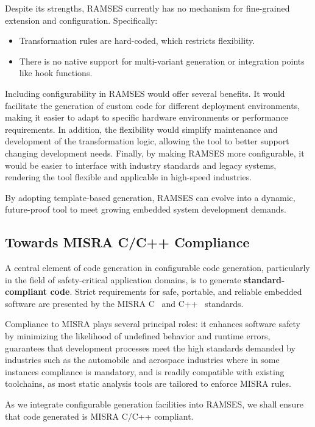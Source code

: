 Despite its strengths, \gls{RAMSES} currently has no mechanism for fine-grained extension and configuration.
Specifically:

\begin{itemize} 
	\item Transformation rules are hard-coded, which restricts flexibility.
	\item There is no native support for multi-variant generation or integration points like hook functions. 
\end{itemize}

Including configurability in \gls{RAMSES} would offer several benefits. It would facilitate the generation of custom code for different deployment environments, making it easier to adapt to specific hardware environments or performance requirements. In addition, the flexibility would simplify maintenance and development of the transformation logic, allowing the tool to better support changing development needs. Finally, by making \gls{RAMSES} more configurable, it would be easier to interface with industry standards and legacy systems, rendering the tool flexible and applicable in high-speed industries.

\begin{tcolorbox}[colback=green!5, colframe=green!40!black] By adopting template-based generation, \gls{RAMSES} can evolve into a dynamic, future-proof tool to meet growing embedded system development demands. \end{tcolorbox}

\subsection*{Towards MISRA C/C++ Compliance}

A central element of code generation in configurable code generation, particularly in the field of safety-critical application domains, is to generate \textbf{standard-compliant code}. Strict requirements for safe, portable, and reliable embedded software are presented by the \gls{MISRA} C~\cite{Misra_C_2025} and C++~\cite{Misra_Cpp_2023} standards.
\par
Compliance to \gls{MISRA} plays several principal roles: it enhances software safety by minimizing the likelihood of undefined behavior and runtime errors, guarantees that development processes meet the high standards demanded by industries such as the automobile and aerospace industries where in some instances compliance is mandatory, and is readily compatible with existing toolchains, as most static analysis tools are tailored to enforce \gls{MISRA} rules.
\par
As we integrate configurable generation facilities into \gls{RAMSES}, we shall ensure that code generated is \gls{MISRA} C/C++ compliant.

